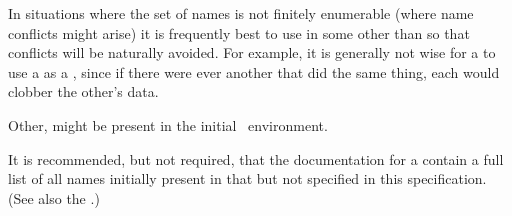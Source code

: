 In situations where the set of names is not finitely enumerable
(\ie where name conflicts might arise)
it is frequently best to use  in some 
other than  so that conflicts will be naturally avoided.
For example, it is generally not wise for a  to use a  
as a , since if there were ever another 
that did the same thing, each would clobber the other's data.

\endsubsubsubsection%

\endsubsubsection%


Other,   might be present
in the initial \clisp\ environment.

It is recommended, but not required, that the documentation for a
 contain a full list of all  names
initially present in that  but not specified in this specification.
(See also the  .)

\endsubsubsection%

\endsubSection%

